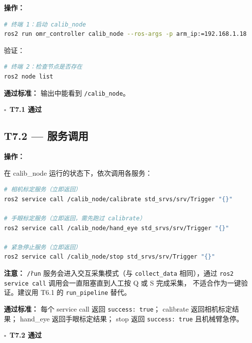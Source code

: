 \documentclass[12pt,a4paper,fontset=ubuntu]{ctexart}
\newcommand{\chkbox}{$\square$}
\newcommand{\passcriteria}[1]{%
  \textbf{通过标准：} #1%
}
\begin{document}
\textbf{操作：}

\begin{lstlisting}[language=bash]
# 终端 1：启动 calib_node
ros2 run omr_controller calib_node --ros-args -p arm_ip:=192.168.1.18
\end{lstlisting}

验证：

\begin{lstlisting}[language=bash]
# 终端 2：检查节点是否存在
ros2 node list
\end{lstlisting}

\passcriteria{ 输出中能看到 \texttt{/calib\_node}。}

\begin{center}\chkbox\ \textbf{T7.1 通过}\end{center}


\subsection{T7.2 — 服务调用}

\textbf{操作：}

在 calib\_node 运行的状态下，依次调用各服务：

\begin{lstlisting}[language=bash]
# 相机标定服务（立即返回）
ros2 service call /calib_node/calibrate std_srvs/srv/Trigger "{}"

# 手眼标定服务（立即返回，需先跑过 calibrate）
ros2 service call /calib_node/hand_eye std_srvs/srv/Trigger "{}"

# 紧急停止服务（立即返回）
ros2 service call /calib_node/stop std_srvs/srv/Trigger "{}"
\end{lstlisting}

\begin{warnbox}
\textbf{注意：} \texttt{\~/run} 服务会进入交互采集模式（与 \texttt{collect\_data}
相同），通过 \texttt{ros2 service call} 调用会一直阻塞直到人工按 Q 或 S 完成采集，
不适合作为一键验证。建议用 T6.1 的 \texttt{run\_pipeline} 替代。
\end{warnbox}

\passcriteria{
  每个 service call 返回 \texttt{success: true}；
  calibrate 返回相机标定结果；
  hand\_eye 返回手眼标定结果；
  stop 返回 \texttt{success: true} 且机械臂急停。
}

\begin{center}\chkbox\ \textbf{T7.2 通过}\end{center}

\end{document}
